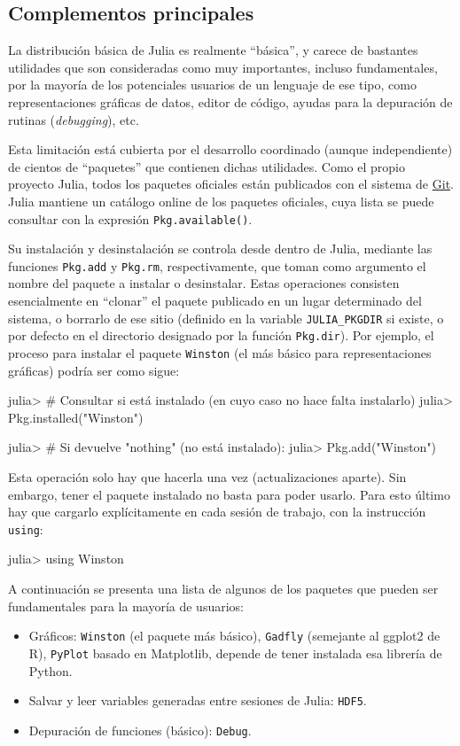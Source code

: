 ﻿\documentclass{article}
\newcommand{\jl}{\texttt}
\begin{document}
\subsection{Complementos principales}

La distribución básica de Julia es realmente ``básica'', y carece de bastantes utilidades que son consideradas como muy importantes, incluso fundamentales, por la mayoría de los potenciales usuarios de un lenguaje de ese tipo, como representaciones gráficas de datos, editor de código, ayudas para la depuración de rutinas (\emph{debugging}), etc.

Esta limitación está cubierta por el desarrollo coordinado (aunque independiente) de cientos de ``paquetes'' que contienen dichas utilidades. Como el propio proyecto Julia, todos los paquetes oficiales están publicados con el sistema de \href{http://git-scm.com/}{Git}. Julia mantiene un catálogo online de los paquetes oficiales, cuya lista se puede consultar con la expresión \jl{Pkg.available()}.

Su instalación y desinstalación se controla desde dentro de Julia, mediante las funciones \jl{Pkg.add} y \jl{Pkg.rm}, respectivamente, que toman como argumento el nombre del paquete a instalar o desinstalar. Estas operaciones consisten esencialmente en ``clonar'' el paquete publicado en un lugar determinado del sistema, o borrarlo de ese sitio (definido en la variable \jl{JULIA_PKGDIR} si existe, o por defecto en el directorio designado por la función \jl{Pkg.dir}). Por ejemplo, el proceso para instalar el paquete \jl{Winston} (el más básico para representaciones gráficas) podría ser como sigue:

julia> # Consultar si está instalado (en cuyo caso no hace falta instalarlo)
julia> Pkg.installed("Winston")

julia> # Si devuelve "nothing" (no está instalado):
julia> Pkg.add("Winston")

Esta operación solo hay que hacerla una vez (actualizaciones aparte). Sin embargo, tener el paquete instalado no basta para poder usarlo. Para esto último hay que cargarlo explícitamente en cada sesión de trabajo, con la instrucción \jl{using}:

julia> using Winston

A continuación se presenta una lista de algunos de los paquetes que pueden ser fundamentales para la mayoría de usuarios:

\begin{itemize}
  \item Gráficos: \texttt{Winston} (el paquete más básico), \texttt{Gadfly} (semejante al ggplot2 de R), \texttt{PyPlot} basado en Matplotlib, depende de tener instalada esa librería de Python.
  \item Salvar y leer variables generadas entre sesiones de Julia: \texttt{HDF5}.
  \item Depuración de funciones (básico): \texttt{Debug}.
\end{itemize}
\end{document}
